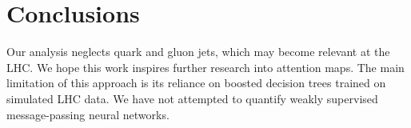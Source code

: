 \section{Conclusions}\label{sec:conclusions}

Our analysis neglects quark and gluon jets, which may become relevant at
the LHC. We hope this work inspires further research into attention
maps. The main limitation of this approach is its reliance on boosted
decision trees trained on simulated LHC data. We have not attempted to
quantify weakly supervised message-passing neural networks.

